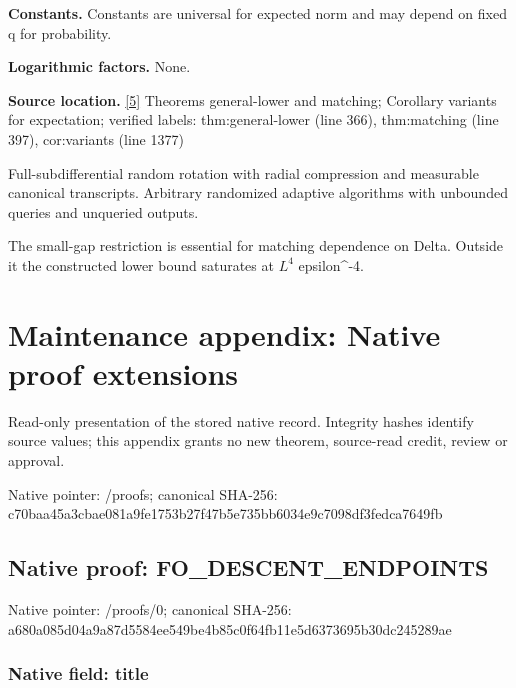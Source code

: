 \documentclass[10pt,a4paper]{article}
\begin{document}
\textbf{Constants.} Constants are universal for expected norm and may depend on fixed q for probability.



\textbf{Logarithmic factors.} None.



\textbf{Source location.} \href{https://github.com/WU-Wendao/Colombo/blob/main/colombo_sensorium/Complexity_altas/data/sources/colombo/N01/manuscript.pdf}{[5]} Theorems general-lower and matching; Corollary variants for expectation; verified labels: thm:general-lower (line 366), thm:matching (line 397), cor:variants (line 1377)



Full-subdifferential random rotation with radial compression and measurable canonical transcripts. Arbitrary randomized adaptive algorithms with unbounded queries and unqueried outputs.



The small-gap restriction is essential for matching dependence on Delta. Outside it the constructed lower bound saturates at $L^4$ epsilon\textasciicircum{}-4.



\section{Maintenance appendix: Native proof extensions}


Read-only presentation of the stored native record. Integrity hashes identify source values; this appendix grants no new theorem, source-read credit, review or approval.



Native pointer: /proofs; canonical SHA-256: c70baa45a3cbae081a9fe175\allowbreak{}3b27f47b5e735bb6034e9c70\allowbreak{}98df3fedca7649fb



\subsection{Native proof: FO\_DESCENT\_ENDPOINTS}


Native pointer: /proofs/0; canonical SHA-256: a680a085d04a9a87d5584ee5\allowbreak{}49be4b85c0f64fb11e5d6373\allowbreak{}695b30dc245289ae



\subsubsection{Native field: title}
\end{document}
